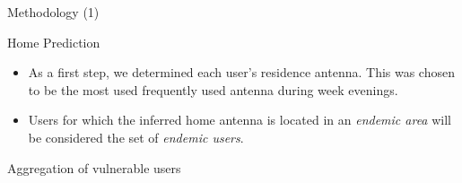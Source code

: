 \documentclass{beamer}
\begin{document}




\begin{frame}{Methodology (1)}
	
	\begin{block}{Home Prediction}
		\begin{itemize}
			\item As a first step, we determined each user's residence antenna. This was chosen to be the most used frequently used antenna during week evenings.
			 
			
			
			\item Users for which the inferred home antenna is located in an \textit{endemic area} will
			be considered the set of \textit{endemic users}. 
			
		\end{itemize}
	\end{block}
	\pause
	\begin{block}{Aggregation of vulnerable users}
		\begin{itemize}
			

\end{itemize}
\end{block}
\end{frame}
\end{document}
